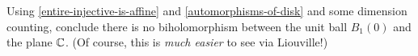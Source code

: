 \documentclass{homework}
\begin{document}
                                                                                                                                \begin{problem}
                                                                                                                                  Using \ref{entire-injective-is-affine} and
                                                                                                                                    \ref{automorphisms-of-disk} and some dimension counting, conclude
                                                                                                                                      there is no biholomorphism between the unit ball $B_1(0)$ and the
                                                                                                                                        plane $\mathbb{C}$.  (Of course, this is \textit{much easier} to see via
                                                                                                                                          Liouville!)
                                                                                                                                          \end{problem}
\end{document}
